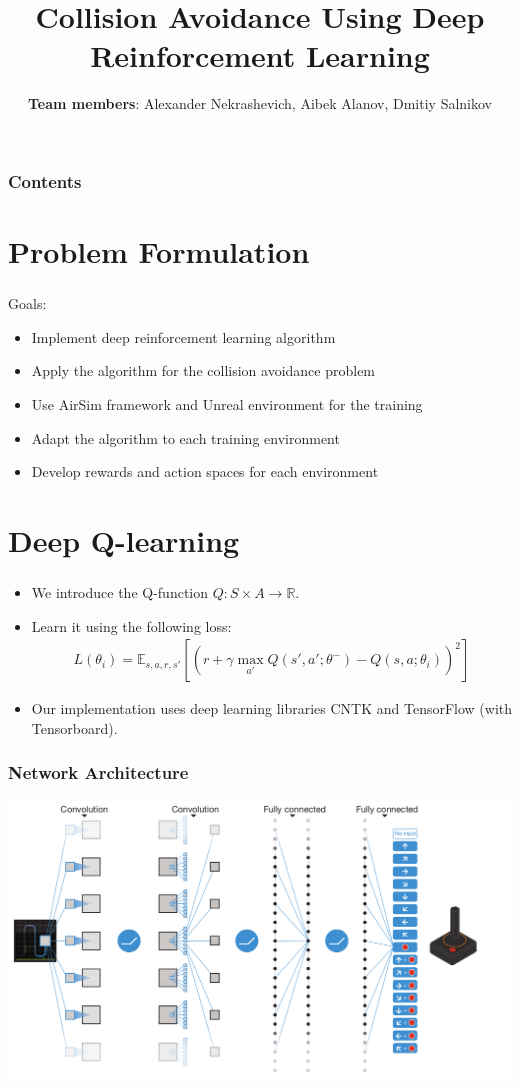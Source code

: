 \documentclass[t]{beamer}
\title[RL] %
{\textbf{Collision Avoidance Using Deep Reinforcement Learning}}
\author[]
{
	\footnotesize {\textbf{Team members}: Alexander Nekrashevich, Aibek Alanov, Dmitiy Salnikov}
}
\institute{}
\date{}
\begin{document}
{

\frame[plain]
{
	\titlepage
}
}
\begin{frame}
	\frametitle{Contents}
	\tableofcontents
\end{frame}

\section{Problem Formulation}

\begin{frame}
	\frametitle{\insertsection}
	Goals:
	\begin{itemize}
		\item Implement deep reinforcement learning algorithm
		\item Apply the algorithm for the collision avoidance problem
		\item Use AirSim framework and Unreal environment for the training
		\item Adapt the algorithm to each training environment
		\item Develop rewards and action spaces for each environment
	\end{itemize}
\end{frame}

\section{Deep Q-learning}

\begin{frame}
	\frametitle{\insertsection}
	\begin{itemize}
		\item We introduce the Q-function $Q: S \times A \to \mathbb{R}$.
		\item Learn it using the following loss:
		\begin{align*}
			L(\theta_i) = \mathbb{E}_{s,a,r,s'} \left[ \left(r + \gamma \max_{a'}Q(s', a'; \theta^{-}) - Q(s, a; \theta_i) \right)^2 \right]
		\end{align*}
		\item Our implementation uses deep learning libraries CNTK
and TensorFlow (with Tensorboard).
	\end{itemize}
\end{frame}

\begin{frame}
	\frametitle{Network Architecture}
	\includegraphics[scale=0.27]{images/dqn_crop.png}
\end{frame}
\end{document}
